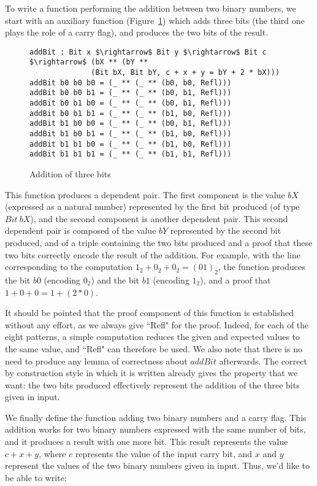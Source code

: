 To write a function performing the addition between two binary numbers,
we start with an auxiliary function (Figure~\ref{addbit}) which adds three bits
(the third one plays the role of a carry flag), and produces the two bits of
the result.

\begin{figure}[H]
\figrule
\begin{center}
\begin{lstlisting}
addBit : Bit x $\rightarrow$ Bit y $\rightarrow$ Bit c $\rightarrow$ (bX ** (bY ** 
              (Bit bX, Bit bY, c + x + y = bY + 2 * bX)))
addBit b0 b0 b0 = (_ ** (_ ** (b0, b0, Refl)))
addBit b0 b0 b1 = (_ ** (_ ** (b0, b1, Refl)))
addBit b0 b1 b0 = (_ ** (_ ** (b0, b1, Refl)))
addBit b0 b1 b1 = (_ ** (_ ** (b1, b0, Refl)))
addBit b1 b0 b0 = (_ ** (_ ** (b0, b1, Refl)))
addBit b1 b0 b1 = (_ ** (_ ** (b1, b0, Refl)))
addBit b1 b1 b0 = (_ ** (_ ** (b1, b0, Refl)))
addBit b1 b1 b1 = (_ ** (_ ** (b1, b1, Refl)))
\end{lstlisting}
\end{center}
\caption{Addition of three bits}
\label{addbit}
\figrule
\end{figure}

This function produces a dependent pair. The first component is the value $bX$
(expressed as a natural number) represented by the first bit produced (of type
$Bit\ bX$), and the second component is another dependent pair. This
second dependent pair is composed of the value $bY$ represented by the second
bit produced, and of a triple containing the two bits produced and a
proof that these two bits correctly encode the result of the addition.
For example, with the line corresponding to the computation
$1_2 + 0_2 + 0_2 = (01)_2$, the function produces the bit $b0$ (encoding $0_2$)
and the bit $b1$ (encoding $1_2$), and a proof that $1 + 0 + 0 = 1 + (2*0)$.

It should be pointed that the proof component of this function is established without any effort, as we always give ``Refl" for the proof. Indeed, for each of the eight patterns, a simple computation reduces the given and expected values to the same value, and ``Refl" can therefore be used. We also note that
there is no need to produce any lemma of correctness about $addBit$ afterwards.
The correct by construction style in which it is written already gives the
property that we want: the two bits produced effectively represent the
addition of the three bits given in input.

We finally define the function adding two binary numbers and a carry flag.
This addition works for two binary numbers
expressed with the same number of bits, and it produces a result with one more
bit. This result represents the value $c + x + y$, where $c$ 
represents the value of the input carry bit, and $x$ and $y$ represent
the values of the two binary numbers given in input. Thus, we'd like to
be able to write:

